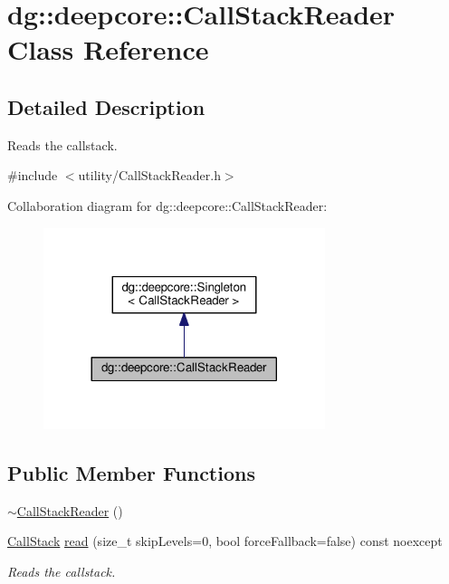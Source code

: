 \hypertarget{classdg_1_1deepcore_1_1_call_stack_reader}{}\section{dg\+:\+:deepcore\+:\+:Call\+Stack\+Reader Class Reference}
\label{classdg_1_1deepcore_1_1_call_stack_reader}


\subsection{Detailed Description}
Reads the callstack. 

{\ttfamily \#include $<$utility/\+Call\+Stack\+Reader.\+h$>$}



Collaboration diagram for dg\+:\+:deepcore\+:\+:Call\+Stack\+Reader\+:
\nopagebreak
\begin{figure}[H]
\begin{center}
\leavevmode
\includegraphics[width=233pt]{classdg_1_1deepcore_1_1_call_stack_reader__coll__graph}
\end{center}
\end{figure}
\subsection*{Public Member Functions}
\begin{DoxyCompactItemize}
\item 
\hyperlink{classdg_1_1deepcore_1_1_call_stack_reader_a2ca85ed337036abaeb59c32c6d050843}{$\sim$\+Call\+Stack\+Reader} ()
\item 
\hyperlink{group___utility_module_gabdf2d70ae3aab3c57142eddec69a725c}{Call\+Stack} \hyperlink{classdg_1_1deepcore_1_1_call_stack_reader_a076bb45153c1336f0b75fb3134ecc967}{read} (size\+\_\+t skip\+Levels=0, bool force\+Fallback=false) const noexcept
\begin{DoxyCompactList}\small\item\em Reads the callstack. \end{DoxyCompactList}\end{DoxyCompactItemize}
